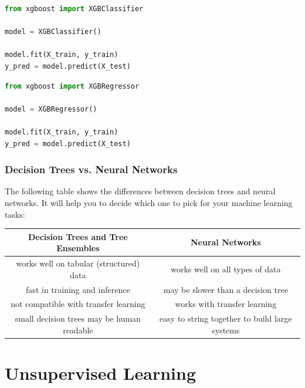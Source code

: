 \documentclass[a4paper, 12pt]{book}
\begin{document}
\begin{table}[h]
\noindent\begin{minipage}{.45\textwidth}
\begin{lstlisting}[language=Python, caption={XGBoost for Classification}]
from xgboost import XGBClassifier

model = XGBClassifier()

model.fit(X_train, y_train)
y_pred = model.predict(X_test)
\end{lstlisting}
\end{minipage}\hfill
\noindent\begin{minipage}{.45\textwidth}
\begin{lstlisting}[language=Python, caption={XGBoost for Regression}]
from xgboost import XGBRegressor

model = XGBRegressor()

model.fit(X_train, y_train)
y_pred = model.predict(X_test)
\end{lstlisting}
\end{minipage}
\end{table}

\subsection{Decision Trees vs. Neural Networks}

The following table shows the differences between decision trees and neural networks. It will help you to decide which one to pick for your machine learning tasks:

\begin{center}
\begin{tabular}{ |c|c| } 
 \hline
 \textbf{Decision Trees and Tree Ensembles} & \textbf{Neural Networks} \\
 \hline
 works well on tabular (structured) data & works well on all types of data \\ 
 fast in training and inference & may be slower than a decision tree\\ 
 not compatible with transfer learning & works with transfer learning \\ 
 small decision trees may be human readable & easy to string together to build large systems \\ 
 \hline
\end{tabular}
\end{center}

\chapter{Unsupervised Learning}
\end{document}
